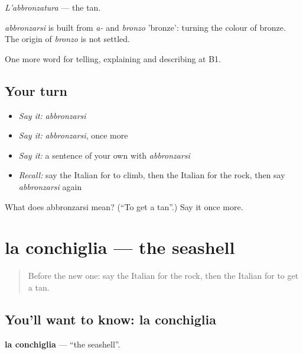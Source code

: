 \emph{L'abbronzatura} — the tan.

\begin{cousinweb}
\emph{abbronzarsi} is built from \emph{a-} and \emph{bronzo} 'bronze': turning the colour of bronze. The origin of \emph{bronzo} is not settled.
\end{cousinweb}

\begin{grammarlens}[title={What you've built}]
One more word for telling, explaining and describing at B1.
\end{grammarlens}

\subsection*{Your turn}
\begin{itemize}
\raggedright
  \item \emph{Say it:} \emph{abbronzarsi}
  \item \emph{Say it:} \emph{abbronzarsi}, once more
  \item \emph{Say it:} a sentence of your own with \emph{abbronzarsi}
  \item \emph{Recall:} say the Italian for to climb, then the Italian for the rock, then say \emph{abbronzarsi} again
\end{itemize}

\begin{tcolorbox}[breakable,colback=teal!4,colframe=teal!35!black,title={Before you move on}]
What does abbronzarsi mean? (\textquotedblleft{}To get a tan\textquotedblright{}.) Say it once more.
\end{tcolorbox}
\section[la conchiglia]{la conchiglia — the seashell}

\label{lesson:IT-C463-conchiglia}



\begin{quote}
Before the new one: say the Italian for the rock, then the Italian for to get a tan.
\end{quote}

\subsection*{You'll want to know: la conchiglia}
\textbf{la conchiglia} — \textquotedblleft{}the seashell\textquotedblright{}.

